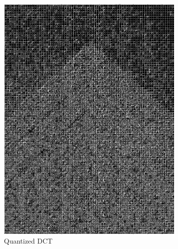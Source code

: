 \documentclass[landscape,a0paper,fontscale=0.5]{baposter} %
\begin{document}
\begin{poster}
{\begin{figure}[H]
\begin{subfigure}{0.2\textwidth}
		\includegraphics[scale=0.115]{5Pattern.jpg}
		\caption{Quantized DCT} %
	\end{subfigure}
	\vspace{1em} %
	\begin{subfigure}{0.2\textwidth} %

\end{subfigure}
\end{figure}}
\end{poster}
\end{document}
